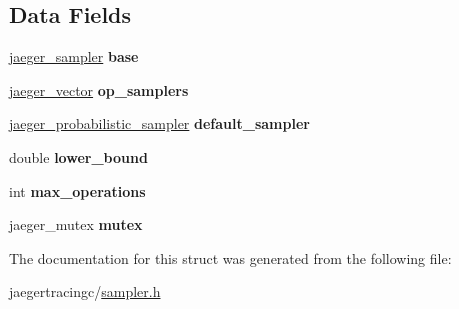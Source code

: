 \subsection*{Data Fields}
\begin{DoxyCompactItemize}
\item 
\mbox{\label{structjaeger__adaptive__sampler_aaa0f3aaf48e84c9c47258009980bc2ac}} 
\mbox{\hyperlink{structjaeger__sampler}{jaeger\+\_\+sampler}} {\bfseries base}
\item 
\mbox{\label{structjaeger__adaptive__sampler_a51357b8b680e9658d185b2a5fcee0ca0}} 
\mbox{\hyperlink{structjaeger__vector}{jaeger\+\_\+vector}} {\bfseries op\+\_\+samplers}
\item 
\mbox{\label{structjaeger__adaptive__sampler_a4bbda4f0edbb4d3e1f3c7633ab208af3}} 
\mbox{\hyperlink{structjaeger__probabilistic__sampler}{jaeger\+\_\+probabilistic\+\_\+sampler}} {\bfseries default\+\_\+sampler}
\item 
\mbox{\label{structjaeger__adaptive__sampler_aaf614c9bb539c04d7700f236e905c8f3}} 
double {\bfseries lower\+\_\+bound}
\item 
\mbox{\label{structjaeger__adaptive__sampler_af3ea970b95f9c506486da7ef8a6e9e8e}} 
int {\bfseries max\+\_\+operations}
\item 
\mbox{\label{structjaeger__adaptive__sampler_a42730aa12aabed22ac323d79b1650b6d}} 
jaeger\+\_\+mutex {\bfseries mutex}
\end{DoxyCompactItemize}


The documentation for this struct was generated from the following file\+:\begin{DoxyCompactItemize}
\item 
jaegertracingc/\mbox{\hyperlink{sampler_8h}{sampler.\+h}}\end{DoxyCompactItemize}
